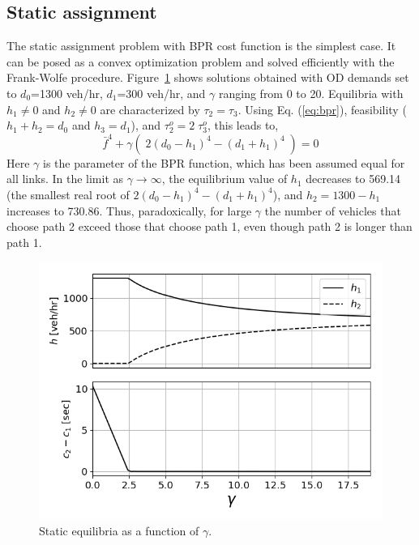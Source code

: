 \subsection{Static assignment}
The static assignment problem with BPR cost function is the simplest case. It can be posed as a convex optimization problem and solved efficiently with the Frank-Wolfe procedure. Figure~\ref{fig:static} shows solutions obtained with OD demands set to $d_0$=1300 veh/hr, $d_1$=300 veh/hr, and $\gamma$ ranging from 0 to 20. Equilibria with $h_1\neq 0$ and $h_2\neq 0$ are characterized by $\tau_2=\tau_3$. Using Eq. (\ref{eq:bpr}), feasibility ($h_1+h_2=d_0$ and $h_3=d_1$), and $\tau^o_2=2\;\tau^o_3$, this leads to,
\begin{equation}
\bar{f}^4 + \gamma\left(\;2(d_0-h_1)^4 - (d_1+h_1)^4 \;\right) = 0
\end{equation}
Here $\gamma$ is the parameter of the BPR function, which has been assumed equal for all links. 
In the limit as $\gamma\rightarrow\infty$, the equilibrium value of $h_1$ decreases to 569.14 (the smallest real root of $2(d_0-h_1)^4 - (d_1+h_1)^4$), and $h_2=1300-h_1$ increases to 730.86. Thus, paradoxically, for large $\gamma$ the number of vehicles that choose path 2 exceed those that choose path 1, even though path 2 is longer than path 1. 

\begin{figure}[ht]
    \centering
    \includegraphics[width=0.8\linewidth]{figs/static.png}
    \caption{Static equilibria as a function of $\gamma$.}
    \label{fig:static}
\end{figure}

